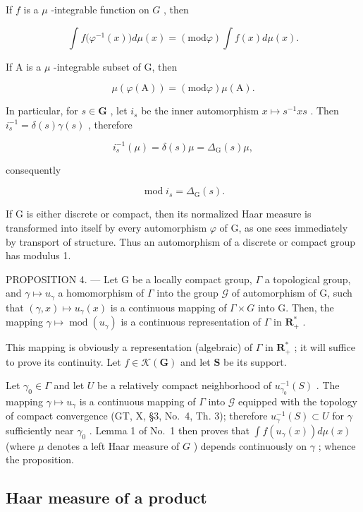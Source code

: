 If \(f\) is a \(\mu\) -integrable function on \(G\) , then

\[
\int f \big (\varphi^ {- 1} (x) \big) d \mu (x) = (\mathrm{mod} \varphi) \int f (x) d \mu (x).\tag{31}
\]

If A is a \(\mu\) -integrable subset of G, then

\[
\mu (\varphi (\mathrm{A})) = (\mathrm{mod} \varphi) \mu (\mathrm{A}).\tag{32}
\]

In particular, for \(s \in \mathbf{G}\) , let \(i_s\) be the inner automorphism \(x \mapsto s^{-1}xs\) . Then \(i_s^{-1} = \delta(s)\gamma(s)\) , therefore

\[
i _ {s} ^ {- 1} (\mu) = \delta (s) \mu = \Delta_ {\mathrm{G}} (s) \mu ,
\]

consequently

\[
\operatorname{mod} i _ {s} = \Delta_ {\mathrm{G}} (s).\tag{33}
\]

If G is either discrete or compact, then its normalized Haar measure is transformed into itself by every automorphism \(\varphi\) of G, as one sees immediately by transport of structure. Thus an automorphism of a discrete or compact group has modulus 1.

PROPOSITION 4. --- Let G be a locally compact group, \(\Gamma\) a topological group, and \(\gamma \mapsto u_{\gamma}\) a homomorphism of \(\Gamma\) into the group \(\mathcal{G}\) of automorphism of G, such that \((\gamma, x) \mapsto u_{\gamma}(x)\) is a continuous mapping of \(\Gamma \times G\) into G. Then, the mapping \(\gamma \mapsto \operatorname{mod}(u_{\gamma})\) is a continuous representation of \(\Gamma\) in \(\mathbf{R}_{+}^{*}\) .

This mapping is obviously a representation (algebraic) of \(\Gamma\) in \(\mathbf{R}_+^*\) ; it will suffice to prove its continuity. Let \(f \in \mathcal{K}(\mathbf{G})\) and let \(\mathbf{S}\) be its support.

Let \(\gamma_0 \in \Gamma\) and let \(U\) be a relatively compact neighborhood of \(u_{\gamma_0}^{-1}(S)\) . The mapping \(\gamma \mapsto u_\gamma\) is a continuous mapping of \(\Gamma\) into \(\mathcal{G}\) equipped with the topology of compact convergence (GT, X, §3, No.~4, Th. 3); therefore \(u_{\gamma}^{-1}(S) \subset U\) for \(\gamma\) sufficiently near \(\gamma_0\) . Lemma 1 of No.~1 then proves that \(\int f(u_\gamma(x)) d\mu(x)\) (where \(\mu\) denotes a left Haar measure of \(G\) ) depends continuously on \(\gamma\) ; whence the proposition.

\subsection{Haar measure of a product}

